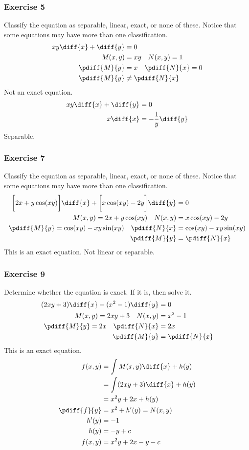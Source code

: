 \documentclass{math}
\begin{document}
\subsubsection*{Exercise 5}
Classify the equation as separable, linear, exact, or none of these. Notice that
some equations may have more than one classification.
\begin{align*}
  xy\diff{x}+\diff{y} &= 0 \\
  M(x,y) &= xy \quad N(x,y) = 1 \\
  \pdiff{M}{y} &= x \quad \pdiff{N}{x} = 0 \\
  \pdiff{M}{y} &\ne \pdiff{N}{x}
\end{align*}
Not an exact equation.
\begin{align*}
  xy\diff{x}+\diff{y} &= 0 \\
  x\diff{x} &= -\frac{1}{y}\diff{y}
\end{align*}
Separable.

\subsubsection*{Exercise 7}
Classify the equation as separable, linear, exact, or none of these. Notice that
some equations may have more than one classification.
\begin{align*}
  \bigg[2x+y\cos(xy)\bigg]\diff{x}+\bigg[x\cos(xy)-2y\bigg]\diff{y} &= 0 \\
  M(x,y) = 2x+y\cos(xy) \quad N(x,y) &= x\cos(xy)-2y \\
  \pdiff{M}{y} = \cos(xy)-xy\sin(xy) \quad
    \pdiff{N}{x} &= \cos(xy)-xy\sin(xy) \\
  \pdiff{M}{y} &= \pdiff{N}{x}
\end{align*}
This is an exact equation. Not linear or separable.

\subsubsection*{Exercise 9}
Determine whether the equation is exact. If it is, then solve it.
\begin{align*}
  (2xy+3)\diff{x}+(x^2-1)\diff{y} &= 0 \\
  M(x,y) = 2xy+3 \quad N(x,y) &= x^2-1 \\
  \pdiff{M}{y} = 2x \quad \pdiff{N}{x} &= 2x \\
  \pdiff{M}{y} &= \pdiff{N}{x}
\end{align*}
This is an exact equation.
\begin{align*}
  f(x,y) &= \int M(x,y)\diff{x}+h(y) \\
  &= \int(2xy+3)\diff{x}+h(y) \\
  &= x^2y+2x+h(y) \\
  \pdiff{f}{y} &= x^2+h'(y) = N(x,y) \\
  h'(y) &= -1 \\
  h(y) &= -y+c \\
  f(x,y) &= x^2y+2x-y-c
\end{align*}
\end{document}

